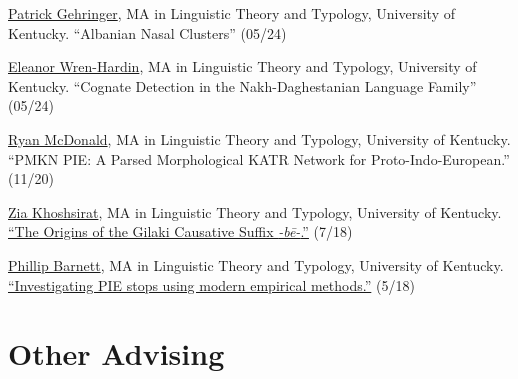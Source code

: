 \documentclass[paper=letter,fontsize=11pt]{scrartcl}
\begin{document}
\begin{etaremune}
\item
\href{https://linguistics.as.uky.edu/users/rmc257}{Patrick Gehringer}, MA in Linguistic Theory and Typology, University of Kentucky. ``Albanian Nasal Clusters'' (05/24)
\item \href{https://linguistics.as.uky.edu/users/rmc257}{Eleanor Wren-Hardin}, MA in Linguistic Theory and Typology, University of Kentucky. ``Cognate Detection in the Nakh-Daghestanian Language Family'' (05/24)
\item \href{https://linguistics.as.uky.edu/users/rmc257}{Ryan McDonald}, MA in Linguistic Theory and Typology, University of Kentucky. ``PMKN PIE: A Parsed Morphological KATR Network for Proto-Indo-European.'' (11/20)
\item \href{https://anthro.ucla.edu/grads/zia-khoshsirat}{Zia Khoshsirat}, MA in Linguistic Theory and Typology, University of Kentucky. {\href{https://uknowledge.uky.edu/ltt_etds/30/}{``The Origins of the Gilaki Causative Suffix \textit{-b\={e}-}.''}} (7/18)
\item \href{https://linguistics.ucla.edu/person/phillip-barnett/}{Phillip Barnett}, MA in Linguistic Theory and Typology, University of Kentucky. {\href{https://uknowledge.uky.edu/ltt_etds/28/}{``Investigating PIE stops using modern empirical methods.''}} (5/18)

\end{etaremune}

\section*{Other Advising}
\end{document}
